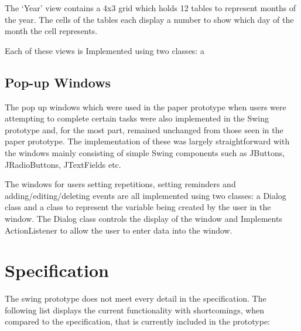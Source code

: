 \documentclass{article}
\begin{document}
The `Year' view contains a 4x3 grid which holds 12 tables to represent
months of the year. The cells of the tables each display a number to
show which day of the month the cell represents.

Each of these views is Implemented using two classes: a 

\subsection{Pop-up Windows}

The pop up windows which were used in the paper prototype when users
were attempting to complete certain tasks were also implemented in the
Swing prototype and, for the most part, remained unchanged from those
seen in the paper prototype. The implementation of these was largely
straightforward with the windows mainly consisting of simple Swing
components such as JButtons, JRadioButtons, JTextFields etc.

The windows for users setting repetitions, setting reminders and
adding/editing/deleting events are all implemented using two classes: a
Dialog class and a class to represent the variable being created by the
user in the window. The Dialog class controls the display of the window
and Implements ActionListener to allow the user to enter data into the
window.


\section{Specification}

The swing prototype does not meet every detail in the specification.
The following list displays the current functionality with shortcomings,
when compared to the specification, that is currently included in the
prototype:
\end{document}
